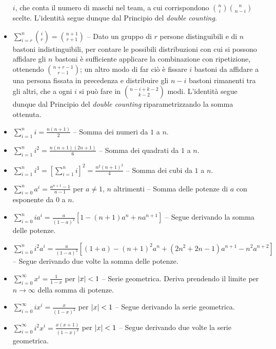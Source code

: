 \begin{itemize}
    $i$, che conta il numero di maschi nel team, a cui corrispondono
    $\binom{n}{i} \binom{n}{n-i}$ scelte. L'identità segue dunque dal Principio
    del \textit{double counting}.
    \item $\sum_{i=r}^n \binom{i}{r} = \binom{n+1}{r+1}$ -- Dato un gruppo di $r$
    persone distinguibili e di $n$ bastoni indistinguibili, per contare le possibili
    distribuzioni con cui si possono affidare gli $n$ bastoni è sufficiente applicare
    la combinazione con ripetizione, ottenendo $\binom{n+r-1}{r-1}$; un altro modo
    di far ciò è fissare $i$ bastoni da affidare a una persona fissata in precedenza
    e distribuire gli $n-i$ bastoni rimanenti tra gli altri, che a ogni $i$ si può fare in
    $\binom{n-i+k-2}{k-2}$ modi. L'identità segue dunque dal Principio del \textit{double
    counting} riparametrizzando la somma ottenuta.
    \item $\sum_{i=1}^n i = \frac{n(n+1)}{2}$ -- Somma dei numeri da $1$ a $n$.
    \item $\sum_{i=1}^n i^2 = \frac{n(n+1)(2n+1)}{6}$ -- Somma dei quadrati da $1$ a $n$.
    \item $\sum_{i=1}^n i^3 = \left[ \sum_{i=1}^n i \right]^2 = \frac{n^2(n+1)^2}{4}$ -- Somma
    dei cubi da $1$ a $n$.
    \item $\sum_{i=0}^n a^i = \frac{a^{n+1}-1}{a-1}$ per $a \neq 1$, $n$ altrimenti -- Somma
    delle potenze di $a$ con esponente da $0$
    a $n$.
    \item $\sum_{i=0}^n i a^i = \frac{a}{(1-a)^2} \left[1 - (n+1)a^n + na^{n+1} \right]$ -- Segue derivando la somma delle potenze.
    \item $\sum_{i=0}^n i^2 a^i = \frac{a}{(1-a)^3} \left[ (1+a) - (n+1)^2 a^n + (2n^2 + 2n-1)a^{n+1} - n^2 a^{n+2} \right]$ -- Segue
    derivando due volte la somma delle potenze.
    \item $\sum_{i=0}^\infty x^i = \frac{1}{1-x}$ per $\left\lvert x \right\rvert < 1$ -- Serie geometrica. Deriva
    prendendo il limite per $n \to \infty$ della
    somma di potenze.
    \item $\sum_{i=0}^\infty i x^i = \frac{x}{(1-x)^2}$ per $\left\lvert x \right\rvert < 1$ -- Segue derivando la serie geometrica.
    \item $\sum_{i=0}^\infty i^2 x^i = \frac{x(x+1)}{(1-x)^3}$ per $\left\lvert x \right\rvert < 1$ -- Segue derivando due volte
    la serie geometrica.
\end{itemize}
